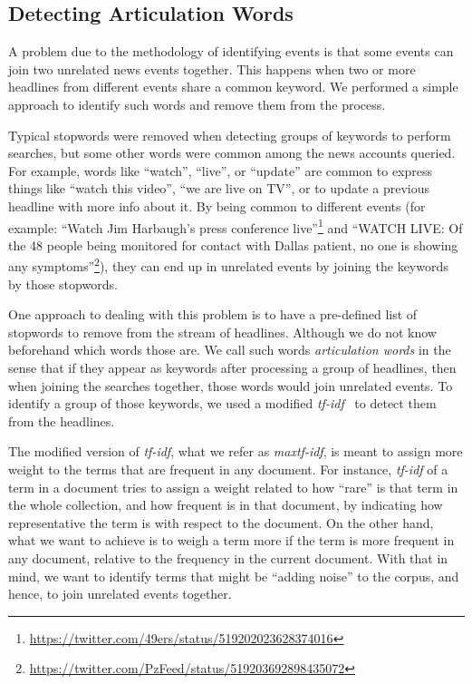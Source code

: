 \subsection{Detecting Articulation Words}

A problem due to the methodology of identifying events is that some events can
join two unrelated news events together. 
%
This happens when two or more headlines from different events share a common
keyword. 
%
We performed a simple approach to identify such words and remove them from the
process.

Typical stopwords were removed when detecting groups of keywords to perform
searches, but some other words were common among the news accounts queried. 
%
For example, words like ``watch'', ``live'', or ``update'' are common to express
things like ``watch this video'', ``we are live on TV'', or to update a previous
headline with more info about it. 
%
By being common to different events (for example: ``Watch Jim Harbaugh's press
conference
live''\footnote{\url{https://twitter.com/49ers/status/519202023628374016}}  and
``WATCH LIVE: Of the 48 people being monitored for contact with Dallas patient,
no one is showing any
symptoms''\footnote{\url{https://twitter.com/PzFeed/status/519203692898435072}}),
they can end up in unrelated events by joining the keywords by those stopwords.


One approach to dealing with this problem is to have a pre-defined list of
stopwords to remove from the stream of headlines. 
%
Although we do not know beforehand which words those are. 
%
We call such words \emph{articulation words} in the sense that if they appear as
keywords after processing a group of headlines, then when joining the searches
together, those words would join unrelated events. 
%
To identify a group of those keywords, we used a modified
\emph{tf-idf}~\cite{sparck1972statistical} to detect them from the headlines.

The modified version of \emph{tf-idf}, what we refer as \emph{maxtf-idf}, is
meant to assign more weight to the terms that are frequent in any document. 
%
For instance, \emph{tf-idf} of a term in a document tries to assign a weight
related to how ``rare'' is that term in the whole collection, and how frequent
is in that document, by indicating how representative the term is with respect
to the document. 
%
On the other hand, what we want to achieve is to weigh a term more if the term
is more frequent in any document, relative to the frequency in the current
document. 
%
With that in mind, we want to identify terms that might be ``adding noise'' to
the corpus, and hence, to join unrelated events together.

